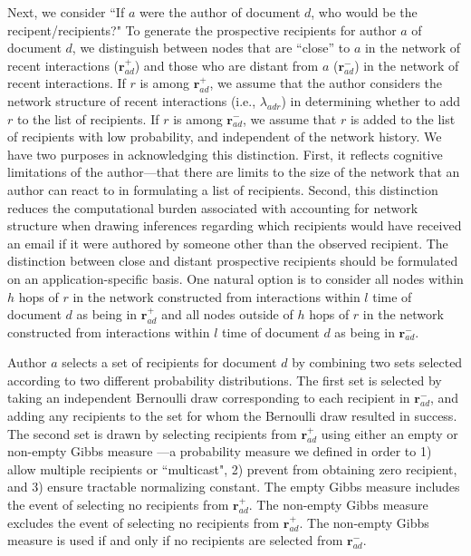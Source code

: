 \documentclass{article}
\begin{document}
Next, we consider ``If $a$ were the
author of document $d$, who would be the recipent/recipients?" To generate the prospective recipients for author $a$ of document $d$, we distinguish between nodes that are ``close'' to $a$ in the network of recent interactions ($\boldsymbol{r}^+_{ad}$) and those who are distant from $a$ ($\boldsymbol{r}^-_{ad}$) in the network of recent interactions. If $r$ is among $\boldsymbol{r}^+_{ad}$, we assume that the author considers the network structure of recent interactions (i.e., $\lambda_{adr}$) in determining whether to add $r$ to the list of recipients. If $r$ is among $\boldsymbol{r}^-_{ad}$, we assume that $r$ is added to the list of recipients with low probability, and independent of the network history. We have two purposes in acknowledging this distinction. First, it reflects cognitive limitations of the author---that there are limits to the size of the network that an author can react to in formulating a list of recipients. Second, this distinction reduces the computational burden associated with accounting for network structure when drawing inferences regarding which recipients would have received an email if it were authored by someone other than the observed recipient. The distinction between close and distant prospective recipients should be formulated on an application-specific basis. One natural option is to consider all nodes within $h$ hops of $r$ in the network constructed from interactions within $l$ time of document $d$ as being in  $\boldsymbol{r}^+_{ad}$ and all nodes outside of $h$ hops of $r$ in the network constructed from interactions within $l$ time of document $d$ as being in $\boldsymbol{r}^-_{ad}$. 
 
Author $a$ selects a set of recipients for document $d$ by combining two sets selected according to two different probability distributions. The first set is selected by taking an independent Bernoulli draw corresponding to each recipient in $\boldsymbol{r}^-_{ad}$, and adding any recipients to the set for whom the Bernoulli draw resulted in success. The second set is drawn by selecting recipients from $\boldsymbol{r}^+_{ad}$ using either an empty or non-empty Gibbs measure \cite{fellows2017removing}---a probability measure we defined in order to 1) allow multiple recipients or ``multicast", 2) prevent from obtaining zero recipient, and 3) ensure tractable normalizing constant. The empty Gibbs measure includes the event of selecting no recipients from $\boldsymbol{r}^+_{ad}$. The non-empty Gibbs measure excludes the event of selecting no recipients from $\boldsymbol{r}^+_{ad}$. The non-empty Gibbs measure is used if and only if no recipients are selected from $\boldsymbol{r}^-_{ad}$.
\end{document}

